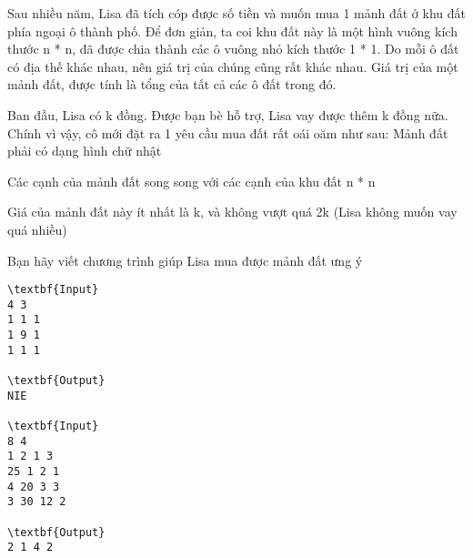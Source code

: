 Sau nhiều năm, Lisa đã tích cóp được số tiền và muốn mua 1 mảnh đất ở khu đất phía ngoại ô thành phố. Để đơn giản, ta coi khu đất này là một hình vuông kích thước n * n, đã được chia thành các ô vuông nhỏ kích thước 1 * 1. Do mỗi ô đất có địa thế khác nhau, nên giá trị của chúng cũng rất khác nhau. Giá trị của một mảnh đất, được tính là tổng của tất cả các ô đất trong đó.  

   Ban đầu, Lisa có k đồng. Được bạn bè hỗ trợ, Lisa vay được thêm k đồng nữa. Chính vì vậy, cô mới đặt ra 1 yêu cầu mua đất rất oái oăm như sau: Mảnh đất phải có dạng hình chữ nhật  

   Các cạnh của mảnh đất song song với các cạnh của khu đất n * n  

   Giá của mảnh đất này ít nhất là k, và không vượt quá 2k (Lisa không muốn vay quá nhiều)  

   Bạn hãy viết chương trình giúp Lisa mua được mảnh đất ưng ý
\begin{verbatim}
\textbf{Input}
4 3
1 1 1
1 9 1
1 1 1

\textbf{Output}
NIE

\textbf{Input}
8 4
1 2 1 3
25 1 2 1
4 20 3 3
3 30 12 2

\textbf{Output}
2 1 4 2
\end{verbatim}